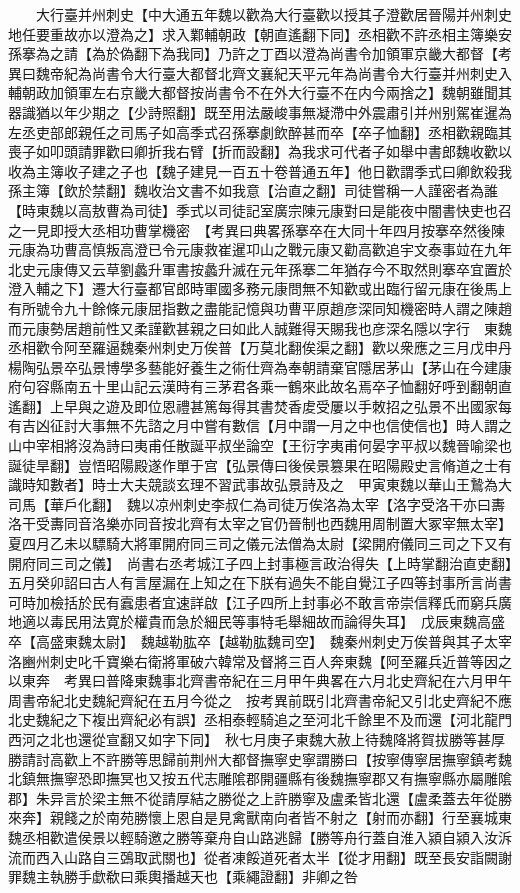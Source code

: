 　　大行臺并州刺史【中大通五年魏以歡為大行臺歡以授其子澄歡居晉陽并州刺史地任要重故亦以澄為之】求入鄴輔朝政【朝直遙翻下同】丞相歡不許丞相主簿樂安孫搴為之請【為於偽翻下為我同】乃許之丁酉以澄為尚書令加領軍京畿大都督【考異曰魏帝紀為尚書令大行臺大都督北齊文襄紀天平元年為尚書令大行臺并州刺史入輔朝政加領軍左右京畿大都督按尚書令不在外大行臺不在内今兩捨之】魏朝雖聞其器識猶以年少期之【少詩照翻】既至用法嚴峻事無凝滯中外震肅引并州别駕崔暹為左丞吏部郎親任之司馬子如高季式召孫搴劇飲醉甚而卒【卒子恤翻】丞相歡親臨其喪子如叩頭請罪歡曰卿折我右臂【折而設翻】為我求可代者子如舉中書郎魏收歡以收為主簿收子建之子也【魏子建見一百五十卷普通五年】他日歡謂季式曰卿飲殺我孫主簿【飲於禁翻】魏收治文書不如我意【治直之翻】司徒嘗稱一人謹密者為誰【時東魏以高敖曹為司徒】季式以司徒記室廣宗陳元康對曰是能夜中闇書快吏也召之一見即授大丞相功曹掌機密　【考異曰典畧孫搴卒在大同十年四月按搴卒然後陳元康為功曹高慎叛高澄已令元康救崔暹卭山之戰元康又勸高歡追宇文泰事竝在九年北史元康傳又云草劉蠡升軍書按蠡升滅在元年孫搴二年猶存今不取然則搴卒宜置於澄入輔之下】遷大行臺都官郎時軍國多務元康問無不知歡或出臨行留元康在後馬上有所號令九十餘條元康屈指數之盡能記憶與功曹平原趙彦深同知機密時人謂之陳趙而元康勢居趙前性又柔謹歡甚親之曰如此人誠難得天賜我也彦深名隱以字行　東魏丞相歡令阿至羅逼魏秦州刺史万俟普【万莫北翻俟渠之翻】歡以衆應之三月戊申丹楊陶弘景卒弘景博學多藝能好養生之術仕齊為奉朝請棄官隱居茅山【茅山在今建康府句容縣南五十里山記云漢時有三茅君各乘一鶴來此故名焉卒子恤翻好呼到翻朝直遙翻】上早與之遊及即位恩禮甚篤每得其書焚香䖍受屢以手敇招之弘景不出國家每有吉凶征討大事無不先諮之月中嘗有數信【月中謂一月之中也信使信也】時人謂之山中宰相將沒為詩曰夷甫任散誕平叔坐論空【王衍字夷甫何晏字平叔以魏晉喻梁也誕徒旱翻】豈悟昭陽殿遂作單于宫【弘景傳曰後侯景篡果在昭陽殿史言脩道之士有識時知數者】時士大夫競談玄理不習武事故弘景詩及之　甲寅東魏以華山王鷙為大司馬【華戶化翻】　魏以凉州刺史李叔仁為司徒万俟洛為太宰【洛字受洛干亦曰夀洛干受夀同音洛樂亦同音按北齊有太宰之官仍晉制也西魏用周制置大冢宰無太宰】　夏四月乙未以驃騎大將軍開府同三司之儀元法僧為太尉【梁開府儀同三司之下又有開府同三司之儀】　尚書右丞考城江子四上封事極言政治得失【上時掌翻治直吏翻】五月癸卯詔曰古人有言屋漏在上知之在下朕有過失不能自覺江子四等封事所言尚書可時加檢括於民有蠧患者宜速詳啟【江子四所上封事必不敢言帝崇信釋氏而窮兵廣地適以毒民用法寛於權貴而急於細民等事特毛舉細故而論得失耳】　戊辰東魏高盛卒【高盛東魏太尉】　魏越勒肱卒【越勒肱魏司空】　魏秦州刺史万俟普與其子太宰洛豳州刺史叱千寶樂右衛將軍破六韓常及督將三百人奔東魏【阿至羅兵近普等因之以東奔　考異曰普降東魏事北齊書帝紀在三月甲午典畧在六月北史齊紀在六月甲午周書帝紀北史魏紀齊紀在五月今從之　按考異前既引北齊書帝紀又引北史齊紀不應北史魏紀之下複出齊紀必有誤】丞相泰輕騎追之至河北千餘里不及而還【河北龍門西河之北也還從宣翻又如字下同】　秋七月庚子東魏大赦上待魏降將賀拔勝等甚厚勝請討高歡上不許勝等思歸前荆州大都督撫寧史寧謂勝曰【按寧傳寧居撫寧鎮考魏北鎮無撫寧恐即撫冥也又按五代志雕隂郡開疆縣有後魏撫寧郡又有撫寧縣亦屬雕隂郡】朱异言於梁主無不從請厚結之勝從之上許勝寧及盧柔皆北還【盧柔蓋去年從勝來奔】親餞之於南苑勝懷上恩自是見禽獸南向者皆不射之【射而亦翻】行至襄城東魏丞相歡遣侯景以輕騎邀之勝等棄舟自山路逃歸【勝等舟行蓋自淮入潁自潁入汝泝流而西入山路自三鵶取武關也】從者凍餒道死者太半【從才用翻】既至長安詣闕謝罪魏主執勝手歔欷曰乘輿播越天也【乘繩證翻】非卿之咎